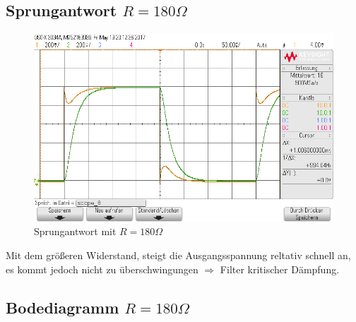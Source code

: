 \subsection{Sprungantwort $R=180\Omega$}

\begin{figure}[H]
  \begin{center}
    \includegraphics[width=1\textwidth]{./Oszi_Bilder/RLC_Sprung_180.png}
    \caption{Sprungantwort mit $R=180\Omega$}
  \end{center}
\end{figure}
\noindent
Mit dem gr\"o\ss{}eren Widerstand, steigt die Ausgangsspannung reltativ schnell an, es kommt jedoch nicht zu \"uberschwingungen $\Rightarrow$ Filter kritischer D\"ampfung. \\

\subsection{Bodediagramm $R=180\Omega$}

